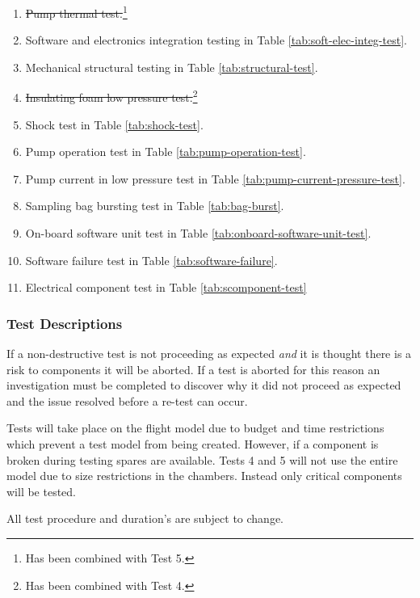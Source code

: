 \begin{enumerate}
    \item \st{Pump thermal test.}\footnote{Has been combined with Test 5.\label{fn:test-combined5}}
    \item Software and electronics integration testing in Table \ref{tab:soft-elec-integ-test}.
    \item Mechanical structural testing in Table \ref{tab:structural-test}.
    \item \st{Insulating foam low pressure test.}\footnote{Has been combined with Test 4.\label{fn:test-combined4}}
    \item Shock test in Table \ref{tab:shock-test}.
    \item Pump operation test in Table \ref{tab:pump-operation-test}.
    \item Pump current in low pressure test in Table \ref{tab:pump-current-pressure-test}.
    \item Sampling bag bursting test in Table \ref{tab:bag-burst}.
    \item On-board software unit test in Table \ref{tab:onboard-software-unit-test}.
    \item Software failure test in Table \ref{tab:software-failure}.
    \item Electrical component test in Table \ref{tab:scomponent-test}
\end{enumerate}

\subsubsection{Test Descriptions}

If a non-destructive test is not proceeding as expected \textit{and} it is thought there is a risk to components it will be aborted. If a test is aborted for this reason an investigation must be completed to discover why it did not proceed as expected and the issue resolved before a re-test can occur.

Tests will take place on the flight model due to budget and time restrictions which prevent a test model from being created. However, if a component is broken during testing spares are available. Tests 4 and 5 will not use the entire model due to size restrictions in the chambers. Instead only critical components will be tested.

All test procedure and duration's are subject to change.

